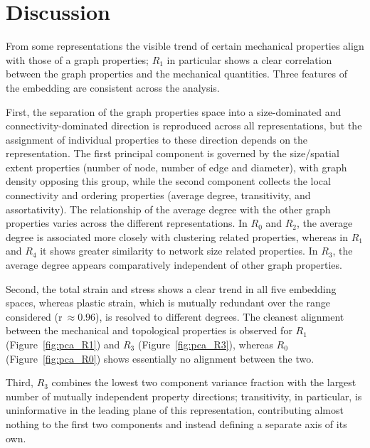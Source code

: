 \documentclass[pdflatex,sn-mathphys-num]{sn-jnl}%
\theoremstyle{thmstyleone}%
\theoremstyle{thmstyletwo}%
\theoremstyle{thmstylethree}%
\begin{document}
\section{Discussion}\label{sec:discussion}

From some representations the visible trend of certain mechanical properties align with those of a graph properties; $R_1$ in particular shows a clear correlation between the graph properties and the mechanical quantities.
Three features of the embedding are consistent across the analysis.

First, the separation of the graph properties space into a size-dominated and connectivity-dominated direction is reproduced across all representations, but the assignment of individual properties to these direction depends on the representation.
The first principal component is governed by the size/spatial extent properties (number of node, number of edge and diameter), with graph density opposing this group, while the second component collects the local connectivity and ordering properties (average degree, transitivity, and assortativity).
The relationship of the average degree with the other graph properties varies across the different representations. In $R_0$ and $R_2$, the average degree is associated more closely with clustering related properties, whereas in $R_1$ and $R_4$ it shows greater similarity to network size related properties. In $R_3$, the average degree appears comparatively independent of other graph properties.

Second, the total strain and stress shows a clear trend in all five embedding spaces, whereas plastic strain, which is mutually redundant over the range considered (r$~\approx 0.96$), is resolved to different degrees.
The cleanest alignment between the mechanical and topological properties is observed for $R_1$ (Figure~\ref{fig:pca_R1}) and $R_3$ (Figure~\ref{fig:pca_R3}), whereas $R_0$ (Figure~\ref{fig:pca_R0}) shows essentially no alignment between the two.

Third, $R_3$ combines the lowest two component variance fraction with the largest number of mutually independent property directions; transitivity, in particular, is uninformative in the leading plane of this representation, contributing almost nothing to the first two components and instead defining a separate axis of its own.
\end{document}
